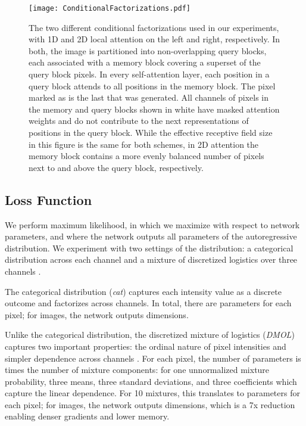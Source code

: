 \documentclass{article}
\begin{document}
\begin{figure}
\texttt{[image: ConditionalFactorizations.pdf]}
  \caption{The two different conditional factorizations used in our experiments, with 1D and 2D local attention on the left and right, respectively. In both, the image is partitioned into non-overlapping query blocks, each associated with a memory block covering a superset of the query block pixels.
  In every self-attention layer, each position in a query block attends to all positions in the memory block.
  The pixel marked as  is the last that was generated. All channels of pixels in the memory and query blocks shown in white have masked attention weights and do not contribute to the next representations of positions in the query block. While the effective receptive field size in this figure is the same for both schemes, in 2D attention the memory block
  contains a more evenly balanced number of pixels next to and above the query block, respectively.}
  \label{fig:conditional-factorizations}
\end{figure}





\subsection{Loss Function}
\label{sub:loss}

We perform maximum likelihood, in which we maximize  with respect to network parameters, and where the
network outputs all parameters of the autoregressive distribution.
We experiment with two settings of the distribution: a categorical distribution across each channel \citep{PixelRNN} and a mixture of discretized logistics over three channels \citep{PixelCNNpp}.

The categorical distribution (\emph{cat}) captures each intensity value as a discrete outcome and factorizes across channels. In total, there are  parameters for each pixel; for  images, the network outputs  dimensions.


Unlike the categorical distribution, the discretized mixture of logistics (\emph{DMOL}) captures two important properties: the ordinal nature of pixel intensities and simpler dependence across channels \citep{PixelCNNpp}.
For each pixel, the number of parameters is  times the number of mixture components:  for one unnormalized mixture probability, three means,
three standard deviations,
and three coefficients 
which capture the linear dependence.
For 10 mixtures, this translates to  parameters for each pixel; for  images, the network outputs  dimensions, which is a 7x reduction enabling denser gradients and lower memory.
 
\end{document}
